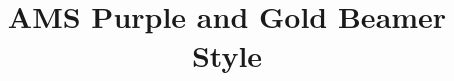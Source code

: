 \newcommand{\swatch}[1]{\fcolorbox{pggreyline}{#1}{\rule{0pt}{1.3ex}\rule{2.2ex}{0pt}}}
\newcommand{\swgroup}[1]{\multicolumn{2}{@{}l}{\textcolor{pgpurple}{\textbf{#1}}}}
\title[AMS Purple and Gold Beamer Style]
{AMS Purple and Gold Beamer Style}
